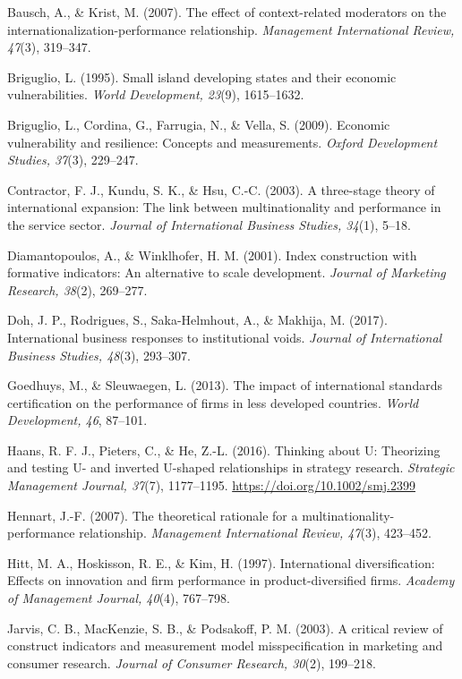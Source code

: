 \documentclass[
  12pt,a4paper]{article}
\begin{document}
Bausch, A., \& Krist, M. (2007). The effect of context-related
moderators on the internationalization-performance relationship.
\emph{Management International Review, 47}(3), 319--347.

Briguglio, L. (1995). Small island developing states and their economic
vulnerabilities. \emph{World Development, 23}(9), 1615--1632.

Briguglio, L., Cordina, G., Farrugia, N., \& Vella, S. (2009). Economic
vulnerability and resilience: Concepts and measurements. \emph{Oxford
Development Studies, 37}(3), 229--247.

Contractor, F. J., Kundu, S. K., \& Hsu, C.-C. (2003). A three-stage
theory of international expansion: The link between multinationality and
performance in the service sector. \emph{Journal of International
Business Studies, 34}(1), 5--18.

Diamantopoulos, A., \& Winklhofer, H. M. (2001). Index construction with
formative indicators: An alternative to scale development. \emph{Journal
of Marketing Research, 38}(2), 269--277.

Doh, J. P., Rodrigues, S., Saka-Helmhout, A., \& Makhija, M. (2017).
International business responses to institutional voids. \emph{Journal
of International Business Studies, 48}(3), 293--307.

Goedhuys, M., \& Sleuwaegen, L. (2013). The impact of international
standards certification on the performance of firms in less developed
countries. \emph{World Development, 46}, 87--101.

Haans, R. F. J., Pieters, C., \& He, Z.-L. (2016). Thinking about U:
Theorizing and testing U- and inverted U-shaped relationships in
strategy research. \emph{Strategic Management Journal, 37}(7),
1177--1195. \url{https://doi.org/10.1002/smj.2399}

Hennart, J.-F. (2007). The theoretical rationale for a
multinationality-performance relationship. \emph{Management
International Review, 47}(3), 423--452.

Hitt, M. A., Hoskisson, R. E., \& Kim, H. (1997). International
diversification: Effects on innovation and firm performance in
product-diversified firms. \emph{Academy of Management Journal, 40}(4),
767--798.

Jarvis, C. B., MacKenzie, S. B., \& Podsakoff, P. M. (2003). A critical
review of construct indicators and measurement model misspecification in
marketing and consumer research. \emph{Journal of Consumer Research,
30}(2), 199--218.
\end{document}
